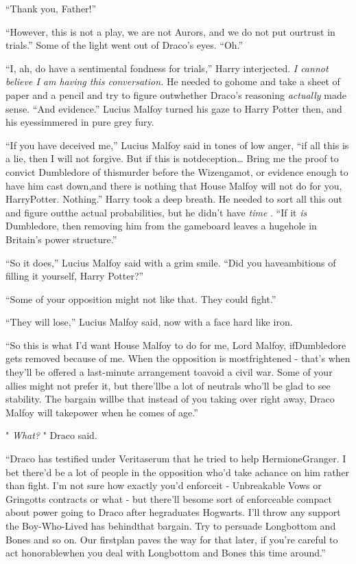 ``Thank you, Father!''

``However, this is not a play, we are not Aurors, and we do not put ourtrust in trials.''
Some of the light went out of Draco's eyes. ``Oh.''

``I, ah, do have a sentimental fondness for trials,'' Harry interjected.
\emph{I cannot believe I am having this conversation.} He needed to gohome and take a sheet of paper and a pencil and try to figure outwhether Draco's reasoning \emph{actually} made sense. ``And evidence.''
Lucius Malfoy turned his gaze to Harry Potter then, and his eyessimmered in pure grey fury.

``If you have deceived me,'' Lucius Malfoy said in tones of low anger,
``if all this is a lie, then I will not forgive. But if this is notdeception\ldots{} Bring me the proof to convict Dumbledore of thismurder before the Wizengamot, or evidence enough to have him cast down,and there is nothing that House Malfoy will not do for you, HarryPotter. Nothing.''
Harry took a deep breath. He needed to sort all this out and figure outthe actual probabilities, but he didn't have \emph{time} . ``If it
\emph{is} Dumbledore, then removing him from the gameboard leaves a hugehole in Britain's power structure.''

``So it does,'' Lucius Malfoy said with a grim smile. ``Did you haveambitions of filling it yourself, Harry Potter?''

``Some of your opposition might not like that. They could fight.''

``They will lose,'' Lucius Malfoy said, now with a face hard like iron.

``So this is what I'd want House Malfoy to do for me, Lord Malfoy, ifDumbledore gets removed because of me. When the opposition is mostfrightened - that's when they'll be offered a last-minute arrangement toavoid a civil war. Some of your allies might not prefer it, but there'llbe a lot of neutrals who'll be glad to see stability. The bargain willbe that instead of you taking over right away, Draco Malfoy will takepower when he comes of age.''

" \emph{What?} " Draco said.

``Draco has testified under Veritaserum that he tried to help HermioneGranger. I bet there'd be a lot of people in the opposition who'd take achance on him rather than fight. I'm not sure how exactly you'd enforceit - Unbreakable Vows or Gringotts contracts or what - but there'll besome sort of enforceable compact about power going to Draco after hegraduates Hogwarts. I'll throw any support the Boy-Who-Lived has behindthat bargain. Try to persuade Longbottom and Bones and so on. Our firstplan paves the way for that later, if you're careful to act honorablewhen you deal with Longbottom and Bones this time around.''

